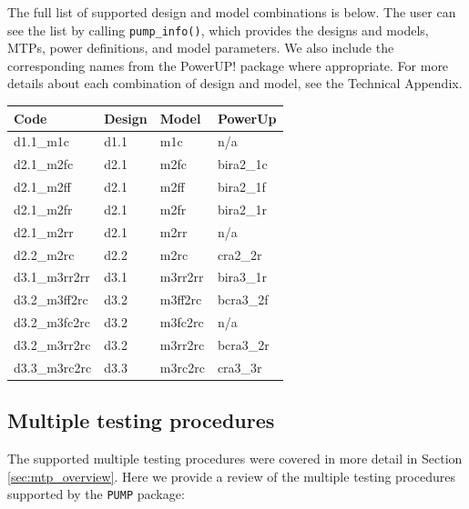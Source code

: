 \documentclass[
]{jss}
\begin{document}
The full list of supported design and model combinations is below. The
user can see the list by calling \texttt{pump\_info()}, which provides
the designs and models, MTPs, power definitions, and model parameters.
We also include the corresponding names from the PowerUP! package where
appropriate. For more details about each combination of design and
model, see the Technical Appendix.

\begin{table}[h!]
\centering
\begin{tabular}{llll}
\toprule
Code & Design & Model & PowerUp\\
\midrule
d1.1\_m1c & d1.1 & m1c & n/a\\
d2.1\_m2fc & d2.1 & m2fc & bira2\_1c\\
d2.1\_m2ff & d2.1 & m2ff & bira2\_1f\\
d2.1\_m2fr & d2.1 & m2fr & bira2\_1r\\
d2.1\_m2rr & d2.1 & m2rr & n/a\\
\addlinespace
d2.2\_m2rc & d2.2 & m2rc & cra2\_2r\\
d3.1\_m3rr2rr & d3.1 & m3rr2rr & bira3\_1r\\
d3.2\_m3ff2rc & d3.2 & m3ff2rc & bcra3\_2f\\
d3.2\_m3fc2rc & d3.2 & m3fc2rc & n/a\\
d3.2\_m3rr2rc & d3.2 & m3rr2rc & bcra3\_2r\\
\addlinespace
d3.3\_m3rc2rc & d3.3 & m3rc2rc & cra3\_3r\\
\bottomrule
\end{tabular}
\end{table}

\subsection{Multiple testing procedures}

The supported multiple testing procedures were covered in more detail in
Section \ref{sec:mtp_overview}. Here we provide a review of the multiple
testing procedures supported by the \texttt{PUMP} package:
\end{document}
